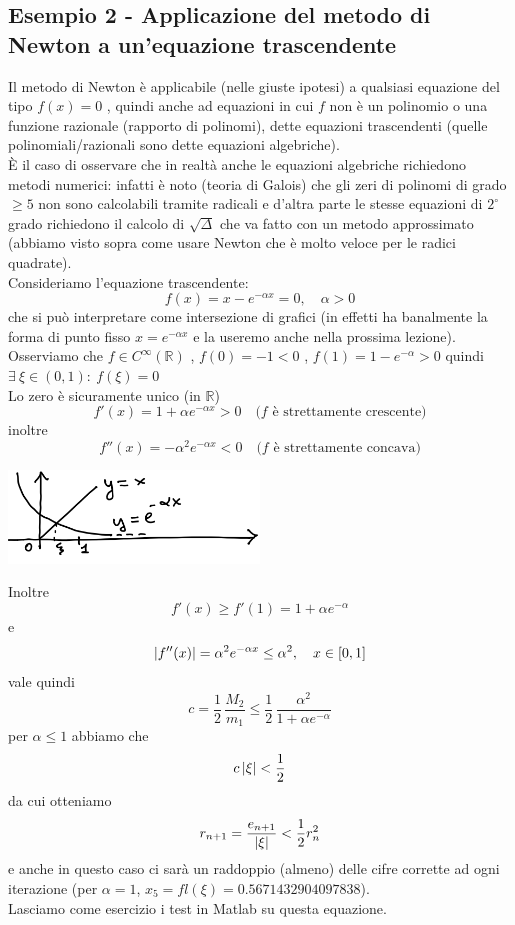 \documentclass[12pt]{article}
\DeclarePairedDelimiter{\abs}{\lvert}{\rvert}
\begin{document}
\subsection{Esempio 2 - Applicazione del metodo di Newton a un'equazione trascendente}
Il metodo di Newton è applicabile (nelle giuste ipotesi) a qualsiasi equazione del tipo $f(x)=0$ , quindi anche ad equazioni in cui $f$ non è un polinomio o una funzione razionale (rapporto di polinomi), dette equazioni trascendenti (quelle polinomiali/razionali sono dette equazioni algebriche).\\
È il caso di osservare che in realtà anche le equazioni algebriche richiedono metodi numerici: infatti è noto (teoria di Galois) che gli zeri di polinomi di grado $\geq 5$ non sono calcolabili tramite radicali e d'altra parte le stesse equazioni di $2^{\circ}$ grado richiedono il calcolo di $\sqrt{\Delta}$ che va fatto con un metodo approssimato (abbiamo visto sopra come usare Newton che è molto veloce per le radici quadrate). \\
Consideriamo l'equazione trascendente: 
\[f(x)=x-e^{-\alpha x}=0 ,\quad \alpha>0 \]
che si può interpretare come intersezione di grafici (in effetti ha banalmente la forma di punto fisso $x=e^{-\alpha x}$ e la useremo anche nella prossima lezione).\\
Osserviamo che $f \in C^{\infty}(\mathbb{R})$ , $f(0)=-1<0$ , $f(1)=1-e^{-\alpha}>0$ quindi $\exists \  \xi \in (0,1):\ f(\xi)=0$\\
Lo zero è sicuramente unico (in $\mathbb{R}$)\\
\[f'(x)=1+\alpha e^{-\alpha x}>0 \quad \text{($f$ è strettamente crescente)}\]
inoltre \[f''(x)=-\alpha^2 e^{-\alpha x}<0 \quad \text{($f$ è strettamente concava)}\]
\begin{center}
\includegraphics[width=0.5\textwidth]{pag34.png}
\end{center}
Inoltre 
\[ f'(x) \geq f'(1) = 1+ \alpha e^{-\alpha} \]
e
\[ \abs{f''(x)} = \alpha^2 e^{-\alpha x} \leq \alpha^2, \quad x\in[0,1] \]
vale quindi
\[ c = \frac{1}{2}\,\frac{M_2}{m_1} \leq \frac{1}{2}\,\frac{\alpha^2}{1+\alpha e^{-\alpha}} \]
per $\alpha \leq 1$ abbiamo che 
\[ c\,\abs{\xi} < \frac{1}{2} \]
da cui otteniamo
\begin{equation*}
    r_{n+1} = \frac{e_{n+1}}{\abs{\xi}} < \frac{1}{2}r_n^2
\end{equation*}
e anche in questo caso ci sarà un raddoppio (almeno) delle cifre corrette ad ogni iterazione (per $\alpha = 1$, $x_5=fl(\xi)=0.5671432904097838$).\\
Lasciamo come esercizio i test in Matlab su questa equazione.
\end{document}

